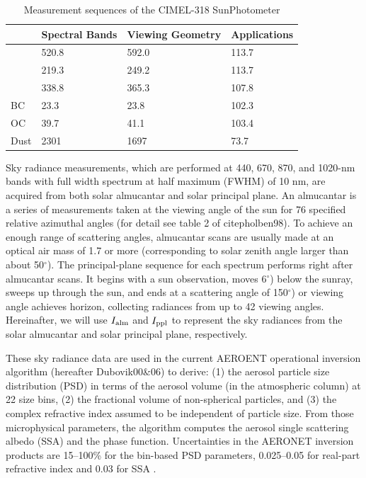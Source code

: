 \begin{table}[b]
  \centering
  \small
  \caption{Measurement sequences of the CIMEL-318 SunPhotometer}
  \label{tab:cimel318}
  \begin{tabular}{m{3em} C{5em} C{15em} C{6em} }
    \toprule
           & Spectral Bands & Viewing Geometry & Applications \\ 
    \midrule
     & 520.8 & 592.0 & 113.7  \\
     & 219.3 & 249.2 & 113.7  \\
     & 338.8 & 365.3 & 107.8  \\
    BC & 23.3 & 23.8 & 102.3  \\
    OC & 39.7 & 41.1 & 103.4  \\
    Dust & 2301 & 1697 & 73.7 \\
    \bottomrule
  \end{tabular}
\end{table}

Sky radiance measurements, which are performed at 440, 670, 870, and 1020-nm
bands with full width spectrum at half maximum (FWHM) of 10 nm, are acquired
from both solar almucantar and solar principal plane. An almucantar is a series
of measurements taken at the viewing angle of the sun for 76 specified relative
azimuthal angles (for detail see table 2 of citep{holben98}). To achieve an
enough range of scattering angles, almucantar scans are usually made at an
optical air mass of 1.7 or more (corresponding to solar zenith angle larger
than about 50$^\circ$). The principal-plane sequence for each spectrum performs right
after almucantar scans. It begins with a sun observation, moves 6$^\circ$) below the
sunray, sweeps up through the sun, and ends at a scattering angle of
150$^\circ$) or viewing angle achieves horizon, collecting radiances from up to 42 viewing
angles. Hereinafter, we will use $I_\text{alm}$ and $I_\text{ppl}$ to represent the sky radiances
from the solar almucantar and solar principal plane, respectively.

These sky radiance data are used in the current AEROENT operational inversion
algorithm \citep{Dubovik00a,Dubovik06} (hereafter Dubovik00\&06) to derive: 
(1) the aerosol particle size distribution (PSD) in
terms of the aerosol volume (in the atmospheric column) at 22 size bins, (2)
the fractional volume of non-spherical particles, and (3) the complex
refractive index assumed to be independent of particle size. From
those microphysical parameters, the \Dub algorithm computes the aerosol
single scattering albedo (SSA) and the phase function. Uncertainties in
the AERONET inversion products are 15--100\% for the bin-based PSD parameters,
0.025--0.05 for real-part refractive index and 0.03 for SSA \citep{Dubovik00b}.

